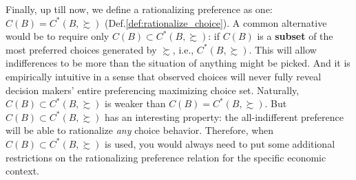 Finally, up till now, we define a rationalizing preference as one: $C(B)=C^*(B,\succsim)$ (Def.\ref{def:rationalize_choice}). A common alternative would be to require only $C(B)\subset C^*(B,\succsim)$: if $C(B)$ is a \textbf{subset} of the most preferred choices generated by $\succsim$, i.e., $C^*(B,\succsim)$. This will allow indifferences
to be more than the situation of anything might be picked. And it is empirically intuitive in a sense that observed choices will never fully reveal decision makers' entire preferencing maximizing choice set. Naturally, $C(B)\subset C^*(B,\succsim)$ is weaker than $C(B)=C^*(B,\succsim)$. But $C(B)\subset C^*(B,\succsim)$ has an interesting property: the all-indifferent preference
will be able to rationalize \textit{any} choice behavior. Therefore, when $C(B)\subset C^*(B,\succsim)$ is used, you would always need to put some additional restrictions on the rationalizing preference relation for the specific economic context.